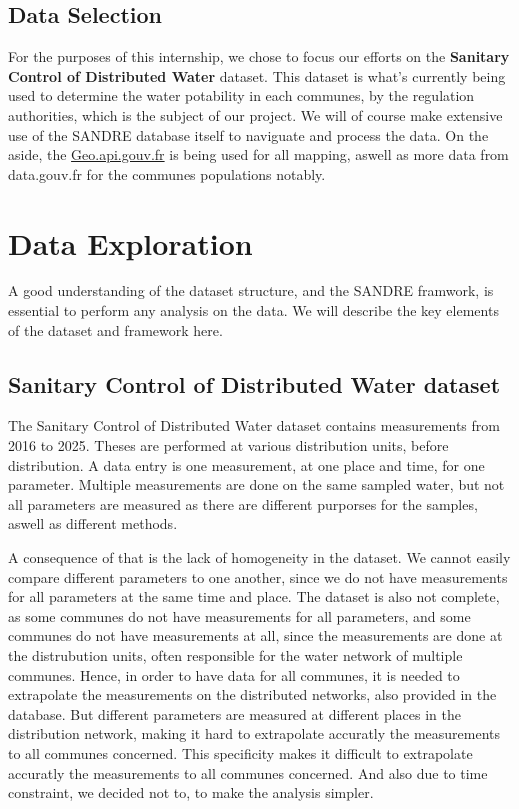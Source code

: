 \documentclass{article}
\begin{document}
\subsection{Data Selection}

For the purposes of this internship, we chose to focus our efforts on the \textbf{Sanitary Control of Distributed Water} dataset. 
This dataset is what's currently being used to determine the water potability in each communes, by the regulation authorities, which is the subject of our project.
We will of course make extensive use of the SANDRE database itself to naviguate and process the data.
On the aside, the \href{https://geo.api.gouv.fr/}{Geo.api.gouv.fr} is being used for all mapping, aswell as more data from data.gouv.fr for the communes populations notably.

\newpage
\section{Data Exploration}
A good understanding of the dataset structure, and the SANDRE framwork, is essential to perform any analysis on the data. We will describe the key elements of the dataset and framework here.
\subsection{Sanitary Control of Distributed Water dataset}
The Sanitary Control of Distributed Water dataset contains measurements from 2016 to 2025. Theses are performed at various distribution units, before distribution.
A data entry is one measurement, at one place and time, for one parameter.
Multiple measurements are done on the same sampled water, but not all parameters are measured as there are different purporses for the samples, aswell as different methods.

A consequence of that is the lack of homogeneity in the dataset. We cannot easily compare different parameters to one another, since we do not have measurements for all parameters at the same time and place.
The dataset is also not complete, as some communes do not have measurements for all parameters, and some communes do not have measurements at all, since the measurements are done at the distrubution units, often responsible for the water network of multiple communes.
Hence, in order to have data for all communes, it is needed to extrapolate the measurements on the distributed networks, also provided in the database.
But different parameters are measured at different places in the distribution network, making it hard to extrapolate accuratly the measurements to all communes concerned.
This specificity makes it difficult to extrapolate accuratly the measurements to all communes concerned. And also due to time constraint, we decided not to, to make the analysis simpler.
\end{document}
